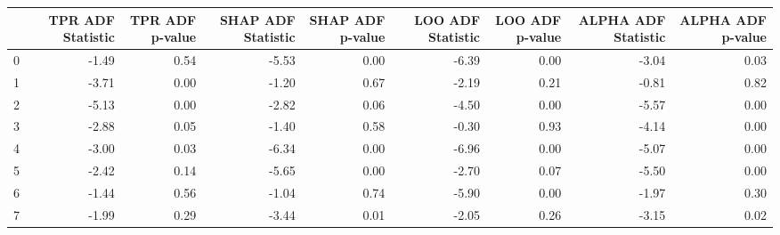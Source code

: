 \begin{tabular}{lrrrrrrrr}
\toprule
 & TPR ADF Statistic & TPR ADF p-value & SHAP ADF Statistic & SHAP ADF p-value & LOO ADF Statistic & LOO ADF p-value & ALPHA ADF Statistic & ALPHA ADF p-value \\
\midrule
0 & -1.49 & 0.54 & -5.53 & 0.00 & -6.39 & 0.00 & -3.04 & 0.03 \\
1 & -3.71 & 0.00 & -1.20 & 0.67 & -2.19 & 0.21 & -0.81 & 0.82 \\
2 & -5.13 & 0.00 & -2.82 & 0.06 & -4.50 & 0.00 & -5.57 & 0.00 \\
3 & -2.88 & 0.05 & -1.40 & 0.58 & -0.30 & 0.93 & -4.14 & 0.00 \\
4 & -3.00 & 0.03 & -6.34 & 0.00 & -6.96 & 0.00 & -5.07 & 0.00 \\
5 & -2.42 & 0.14 & -5.65 & 0.00 & -2.70 & 0.07 & -5.50 & 0.00 \\
6 & -1.44 & 0.56 & -1.04 & 0.74 & -5.90 & 0.00 & -1.97 & 0.30 \\
7 & -1.99 & 0.29 & -3.44 & 0.01 & -2.05 & 0.26 & -3.15 & 0.02 \\
\bottomrule
\end{tabular}
